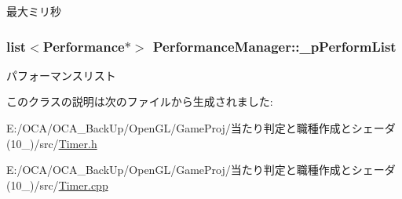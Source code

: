 最大ミリ秒 

\hypertarget{class_performance_manager_aee017e3d7b3f4dd2b21c826f8e88639e}{
\subsubsection[{\-\_\-p\-Perform\-List}]{\setlength{\rightskip}{0pt plus 5cm}list$<${\bf Performance}$\ast$$>$ Performance\-Manager\-::\-\_\-p\-Perform\-List\hspace{0.3cm}{\ttfamily [protected]}}}\label{class_performance_manager_aee017e3d7b3f4dd2b21c826f8e88639e}


パフォーマンスリスト 



このクラスの説明は次のファイルから生成されました\-:\begin{DoxyCompactItemize}
\item 
E\-:/\-O\-C\-A/\-O\-C\-A\-\_\-\-Back\-Up/\-Open\-G\-L/\-Game\-Proj/当たり判定と職種作成とシェーダ(10\-\_)/src/\hyperlink{_timer_8h}{Timer.\-h}\item 
E\-:/\-O\-C\-A/\-O\-C\-A\-\_\-\-Back\-Up/\-Open\-G\-L/\-Game\-Proj/当たり判定と職種作成とシェーダ(10\-\_)/src/\hyperlink{_timer_8cpp}{Timer.\-cpp}\end{DoxyCompactItemize}
